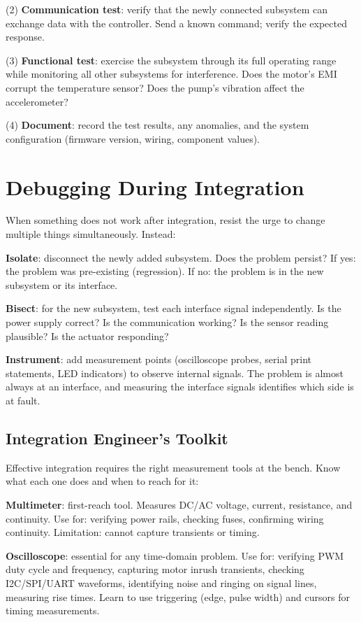 (2) \textbf{Communication test}: verify that the newly connected subsystem can exchange data with the controller. Send a known command; verify the expected response.

(3) \textbf{Functional test}: exercise the subsystem through its full operating range while monitoring all other subsystems for interference. Does the motor's EMI corrupt the temperature sensor? Does the pump's vibration affect the accelerometer?

(4) \textbf{Document}: record the test results, any anomalies, and the system configuration (firmware version, wiring, component values).

\section{Debugging During Integration}
When something does not work after integration, resist the urge to change multiple things simultaneously. Instead:

\textbf{Isolate}: disconnect the newly added subsystem. Does the problem persist? If yes: the problem was pre-existing (regression). If no: the problem is in the new subsystem or its interface.

\textbf{Bisect}: for the new subsystem, test each interface signal independently. Is the power supply correct? Is the communication working? Is the sensor reading plausible? Is the actuator responding?

\textbf{Instrument}: add measurement points (oscilloscope probes, serial print statements, LED indicators) to observe internal signals. The problem is almost always at an interface, and measuring the interface signals identifies which side is at fault.

\subsection{Integration Engineer's Toolkit}
Effective integration requires the right measurement tools at the bench. Know what each one does and when to reach for it:

\textbf{Multimeter}: first-reach tool. Measures DC/AC voltage, current, resistance, and continuity. Use for: verifying power rails, checking fuses, confirming wiring continuity. Limitation: cannot capture transients or timing.

\textbf{Oscilloscope}: essential for any time-domain problem. Use for: verifying PWM duty cycle and frequency, capturing motor inrush transients, checking I2C/SPI/UART waveforms, identifying noise and ringing on signal lines, measuring rise times. Learn to use triggering (edge, pulse width) and cursors for timing measurements.

